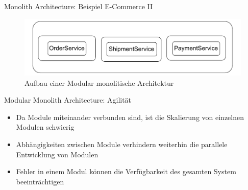 \begin{frame}{Monolith Architecture: Beispiel E-Commerce II}
    \begin{figure}[!h]
        \centering
        \includegraphics[scale=0.70]{imglib/mono/mono-example}
        \caption{Aufbau einer Modular monolitische Architektur}
        \label{fig:mono-modular}
    \end{figure}
\end{frame}

\begin{frame}{Modular Monolith Architecture: Agilität}
    \begin{itemize}
      \item Da Module miteinander verbunden sind, ist die Skalierung von einzelnen Modulen schwierig
      \item Abhängigkeiten zwischen Module verhindern weiterhin die parallele Entwicklung von Modulen
      \item Fehler in einem Modul können die Verfügbarkeit des gesamten System beeinträchtigen
    \end{itemize}
\end{frame}
